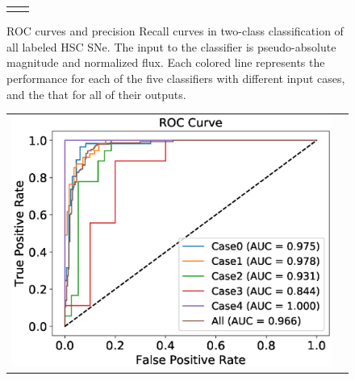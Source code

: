 \documentclass[useamsfonts]{pasj01}
\begin{document}
\begin{figure}[htbp]
\begin{tabular}{cc}
\begin{minipage}{0.5\hsize}
\begin{center}
            \end{center}
        \end{minipage}
    \end{tabular}
    \vspace{2mm}
    \caption{%
    ROC curves and precision Recall curves in two-class classification of all labeled HSC SNe.
    The input to the classifier is pseudo-absolute magnitude and normalized flux.
    Each colored line represents the performance for each of the five classifiers with different input cases, and the that for all of their outputs.
    }
    \label{fig:h2_test_all}
\end{figure}
%
%
%
\begin{figure}[htbp]
    \begin{tabular}{cc}
        \begin{minipage}{0.5\hsize}
            \begin{center}
                \includegraphics[width=\columnwidth]{figures/10_absolute-magnitude-scaled-flux-remove-y_SNdata_test_190522_ROC_noedge_spec.eps}
            \end{center}
        \end{minipage}
        \begin{minipage}{0.5\hsize}
            \begin{center}

\end{center}
\end{minipage}
\end{tabular}
\end{figure}
\end{document}
